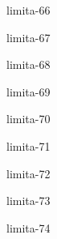 \begin{defproblem}{limita-66}

\end{defproblem}

\begin{defproblem}{limita-67}

\end{defproblem}

\begin{defproblem}{limita-68}

\end{defproblem}

\begin{defproblem}{limita-69}

\end{defproblem}

\begin{defproblem}{limita-70}

\end{defproblem}

\begin{defproblem}{limita-71}

\end{defproblem}

\begin{defproblem}{limita-72}

\end{defproblem}

\begin{defproblem}{limita-73}

\end{defproblem}

\begin{defproblem}{limita-74}

\end{defproblem}